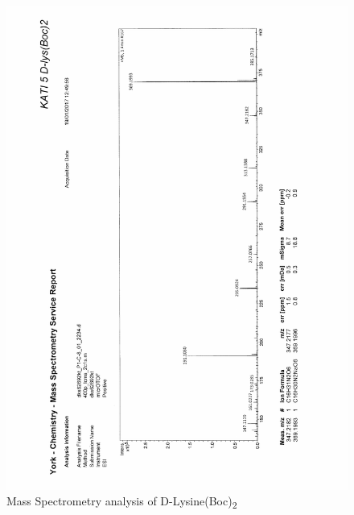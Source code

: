 \begin{figure}[ht!]
\centering
\includegraphics[scale=0.75]{Mass_Spec/KAT1_5.PDF}
\caption{Mass Spectrometry analysis of D-Lysine(Boc)\textsubscript{2}}
\end{figure}

